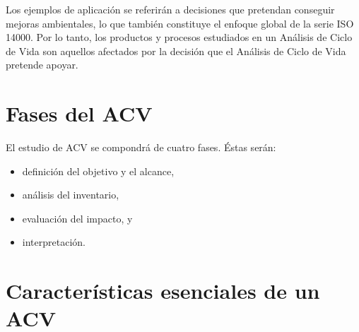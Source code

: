 Los ejemplos de aplicación se referirán a decisiones que pretendan conseguir mejoras ambientales, lo que también constituye el enfoque global de la serie ISO 14000. Por lo tanto, los productos y procesos estudiados en un Análisis de Ciclo de Vida son aquellos afectados por la decisión que el Análisis de Ciclo de Vida pretende apoyar.

\section{Fases del ACV}

El estudio de ACV se compondrá de cuatro fases. Éstas serán:
\begin{itemize}
  \item definición del objetivo y el alcance,
  \item análisis del inventario,
  \item evaluación del impacto, y
  \item interpretación.
\end{itemize}

\section{Características esenciales de un ACV}

